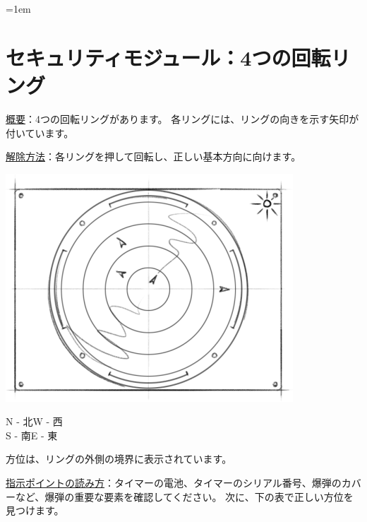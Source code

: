 \begin{minipage}{0.63\textwidth}
    \parskip=1em
    \section*{セキュリティモジュール：4つの回転リング}
    
    \uline{概要}：4つの回転リングがあります。 各リングには、リングの向きを示す矢印が付いています。
    
    \uline{解除方法}：各リングを押して回転し、正しい基本方向に向けます。
\end{minipage}%
\hfill%
\begin{minipage}{0.33\textwidth}
    \includegraphics[width=\textwidth]{images/17.png}
    \vspace*{\fill}
\end{minipage}

\hspace*{3em}N - 北\hspace*{3em}W - 西\\
\hspace*{3em}S - 南\hspace*{3em}E - 東

方位は、リングの外側の境界に表示されています。

\uline{指示ポイントの読み方}：タイマーの電池、タイマーのシリアル番号、爆弾のカバーなど、爆弾の重要な要素を確認してください。 次に、下の表で正しい方位を見つけます。


